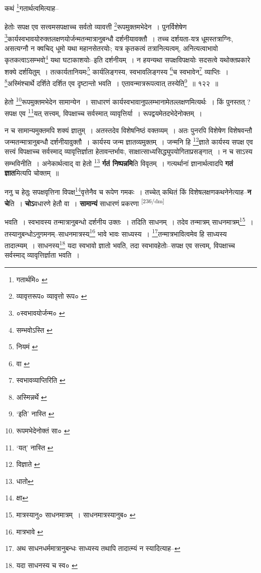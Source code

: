 \documentclass[article,12pt,a4paper]{memoir}
\begin{document}
	कथं \footnote{गतार्थमि० \cite{dp-edE}}गतार्थत्वमित्याह-- 
	  
	हेतोः सपक्ष एव सत्त्वमसपक्षाच्च सर्वतो व्यावत्ती \footnote{व्यावृत्तरूप० \cite{dp-msB} \cite{dp-edP} व्यावृत्तो रूप० \cite{dp-edH}}रूपमुक्तमभेदेन । पुनर्विशेषेण \footnote{०स्वभावयोर्जन्म० \cite{dp-msB} \cite{dp-msD} \cite{dp-edP} \cite{dp-edH} \cite{dp-edE} \cite{dp-edN}}कार्यस्वभावयोरुक्तलक्षणयोर्जन्मतन्मात्रानुबन्धौ दर्शनीयावक्तौ । तच्च दर्शयता-यत्र धूमस्तत्राग्निः, असत्यग्नौ न क्वचिद् धूमो यथा महानसेतरयोः; यत्र कृतकत्वं तत्रानित्यत्वम्, अनित्यत्वाभावो कृतकत्वाऽसम्भवो\footnote{सम्भवोऽस्ति \cite{dp-msC}} यथा घटाकाशयोः--इति दर्शनीयम् । न हयन्यथा सपक्षविपक्षयोः सदसत्वे यथोक्तप्रकारे शक्ये दर्शयितुम् । तत्कार्यतानियमः\footnote{नियमं \cite{dp-msC}} कार्यलिङ्गस्य, स्वभावलिङ्गस्य \footnote{वा \cite{dp-msC}}च स्वभावेन\footnote{स्वभावव्याप्तिरिति \cite{dp-msC}} व्याप्तिः । \footnote{अस्मिन्नर्थे \cite{dp-msC}}अस्मिंश्चार्थे दर्शिते दर्शित एव दृष्टान्तो भवति । एतावन्मात्ररूपत्वात् तस्येति\footnote{‘इति’ नास्ति \cite{dp-msC}} ॥ १२२ ॥ 
	  
	हेतो \footnote{रूपमभेदेनोक्तं सा० \cite{dp-msA} \cite{dp-msD} \cite{dp-edP} \cite{dp-edH} \cite{dp-edE}}रूपमुक्तमभेदेन सामान्येन । साधारणं कार्यस्वभावानुपलम्भानामेतल्लक्षणमित्यर्थः । किं पुनस्तत् ? सपक्ष एव \footnote{‘यत्’ नास्ति \cite{dp-msB} \cite{dp-msC} \cite{dp-msD}}यत् सत्त्वम्, विपक्षाच्च सर्वस्मात् व्यावृत्तिर्या । रूपद्वयमेतदभेदेनोक्तम् । 
	  
	न च सामान्यमुक्तमपि शक्यं ज्ञातुम् । अतस्तदेव विशेषनिष्ठं वक्तव्यम् । अतः पुनरपि विशेषेण विशेषवन्तौ जन्मतन्मात्रानुबन्धौ दर्शनीयावुक्तौ । कार्यस्य जन्म ज्ञातव्यमुक्तम् । जन्मनि हि \footnote{विज्ञाते \cite{dp-msA} \cite{dp-edP} \cite{dp-edH} \cite{dp-edE}}ज्ञाते कार्यस्य सपक्ष एव सत्त्वं विपक्षाच्च सर्वस्माद् व्यावृत्तिर्ज्ञाता हेतावन्तर्भावः, साक्षात्साध्यसिद्ध्युपयोगिताप्रसङ्गात् । न च साऽस्य सम्भविनीति । अनेकार्थत्वाद् वा हेतो \footnote{धातो} \textbf{र्गतं निष्पन्नमि}ति विवृतम् । गत्यर्थानां ज्ञानार्थत्वादपि \textbf{गतं ज्ञात}मित्यपि चोक्तम् ॥
	\pend
      

	  \pstart ननु च हेतुः सपक्षवृत्तिना विपक्ष\footnote{क्षा}वृत्तेनैव च रूपेण गमकः । तच्चेत् कथितं किं विशेषलक्षणकथनेनेत्याह--\textbf{न चे}ति । \textbf{चोऽ}वधारणे हेतौ वा । \textbf{सामान्यं} साधारणं प्रकरणा  \leavevmode\textsuperscript{\rmlatinfont\tiny [236/dm]} 
	  
	भवति । स्वभावस्य तन्मात्रानुबन्धो दर्शनीय उक्तः । तदिति साधनम् । तदेव तन्मात्रम् साधनमात्रम्\footnote{मात्रस्यानु० \cite{dp-msC} \cite{dp-msD} साधनमात्रम् । साधनमात्रस्यानुब० \cite{dp-msB} \cite{dp-edN}} । तस्यानुबन्धोऽनुगमनम्--साधनमात्रस्य\footnote{मात्रभावे \cite{dp-msA} \cite{dp-msB} \cite{dp-msD} \cite{dp-edP} \cite{dp-edH} \cite{dp-edE} \cite{dp-edN}} भावे भावः साध्यस्य । \footnote{अथ साधनधर्ममात्रानुबन्धः साध्यस्य तथापि तादात्म्यं न स्यादित्याह--\cite{dp-msD-n}}तन्मात्रभावित्वमेव हि साध्यस्य तादात्म्यम् । साधनस्य\footnote{यदा साधनस्य च स्व० \cite{dp-msC}} यदा स्वभावो ज्ञातो भवति, तदा स्वभावहेतोः--सपक्ष एव सत्त्वम्, विपक्षाच्च सर्वस्माद् व्यावृत्तिर्ज्ञाता भवति । 
	  
\end{document}

